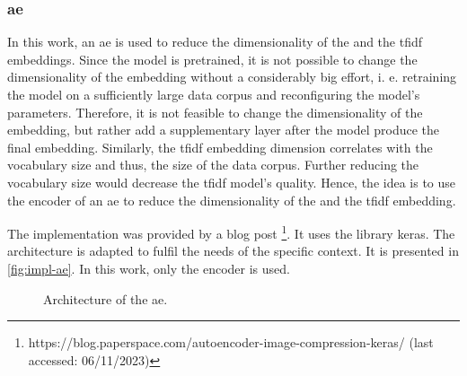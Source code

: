 \subsubsection*{\acl{ae}}\label{subsubsec:impl-autoencoder}

In this work, an \ac{ae} is used to reduce the dimensionality of the \infersent{} and the \ac{tfidf} embeddings.
Since the \infersent{} model is pretrained, it is not possible to change the dimensionality of the embedding without a considerably big effort,
i. e. retraining the model on a sufficiently large data corpus and reconfiguring the model's parameters.
Therefore, it is not feasible to change the dimensionality of the \infersent{} embedding, but rather add a supplementary layer after the model 
produce the final embedding.
Similarly, the \ac{tfidf} embedding dimension correlates with the vocabulary size and thus, the size of the data corpus.
Further reducing the vocabulary size would decrease the \ac{tfidf} model's quality.
Hence, the idea is to use the encoder of an \ac{ae} to reduce the dimensionality of the \infersent{} and the \ac{tfidf} embedding.

The implementation was provided by a blog post
\footnote{https://blog.paperspace.com/autoencoder-image-compression-keras/ (last accessed: 06/11/2023)}.
It uses the library keras.
The architecture is adapted to fulfil the needs of the specific context.
It is presented in \autoref{fig:impl-ae}.
In this work, only the encoder is used.
%     

\begin{figure}[!htb] %
    \centering
    
    \caption[Architecture of the \ac{ae}]{Architecture of the \ac{ae}.}
    \label{fig:impl-ae}
\end{figure}